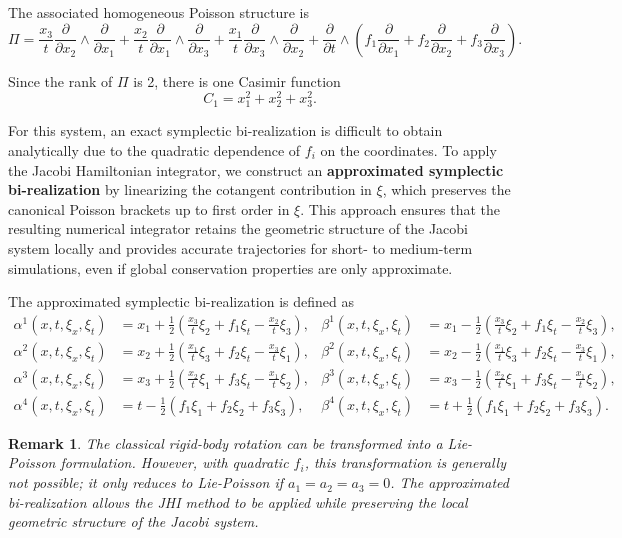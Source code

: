 \documentclass[12pt,english]{article}
\newtheorem{remark}[thm]{Remark}
\begin{document}
The associated homogeneous Poisson structure is
\[
\Pi = \frac{x_3}{t}\frac{\partial}{\partial x_2}\wedge \frac{\partial}{\partial x_1} + \frac{x_2}{t} \frac{\partial}{\partial x_1}\wedge \frac{\partial}{\partial x_3} + \frac{x_1}{t} \frac{\partial}{\partial x_3}\wedge \frac{\partial}{\partial x_2} + \frac{\partial}{\partial t}\wedge(f_1 \frac{\partial}{\partial x_1} + f_2 \frac{\partial}{\partial x_2} + f_3 \frac{\partial}{\partial x_3}).
\]

Since the rank of $\Pi$ is 2, there is one Casimir function
\[
C_1 = x_1^2 + x_2^2 + x_3^2.
\]

For this system, an exact symplectic bi-realization is difficult to obtain analytically due to the quadratic dependence of $f_i$ on the coordinates. To apply the Jacobi Hamiltonian integrator, we construct an \textbf{approximated symplectic bi-realization} by linearizing the cotangent contribution in $\xi$, which preserves the canonical Poisson brackets up to first order in $\xi$. This approach ensures that the resulting numerical integrator retains the geometric structure of the Jacobi system locally and provides accurate trajectories for short- to medium-term simulations, even if global conservation properties are only approximate.

The approximated symplectic bi-realization is defined as
\begin{align*}
\alpha^1(x,t,\xi_x,\xi_t) &= x_1 + \frac12\left(\frac{x_3}{t}\xi_2 + f_1 \xi_t - \frac{x_2}{t}\xi_3\right), &
\beta^1(x,t,\xi_x,\xi_t) &= x_1 - \frac12\left(\frac{x_3}{t}\xi_2 + f_1 \xi_t - \frac{x_2}{t}\xi_3\right),\\
\alpha^2(x,t,\xi_x,\xi_t) &= x_2 + \frac12\left(\frac{x_1}{t}\xi_3 + f_2 \xi_t-\frac{x_3}{t}\xi_1 \right), &
\beta^2(x,t,\xi_x,\xi_t) &= x_2 - \frac12\left(\frac{x_1}{t}\xi_3 + f_2 \xi_t-\frac{x_3}{t}\xi_1 \right),\\
\alpha^3(x,t,\xi_x,\xi_t) &= x_3 + \frac12\left(\frac{x_2}{t}\xi_1 + f_3 \xi_t - \frac{x_1}{t}\xi_2\right), &
\beta^3(x,t,\xi_x,\xi_t) &= x_3 - \frac12\left(\frac{x_2}{t}\xi_1 + f_3 \xi_t - \frac{x_1}{t}\xi_2\right),\\
\alpha^4(x,t,\xi_x,\xi_t) &= t - \frac12(f_1 \xi_1 + f_2 \xi_2 + f_3 \xi_3), &
\beta^4(x,t,\xi_x,\xi_t) &= t + \frac12(f_1 \xi_1 + f_2 \xi_2 + f_3 \xi_3).
\end{align*}

\begin{remark}
The classical rigid-body rotation can be transformed into a Lie-Poisson formulation. However, with quadratic $f_i$, this transformation is generally not possible; it only reduces to Lie-Poisson if $a_1=a_2=a_3=0$. The approximated bi-realization allows the JHI method to be applied while preserving the local geometric structure of the Jacobi system.
\end{remark}
\end{document}
